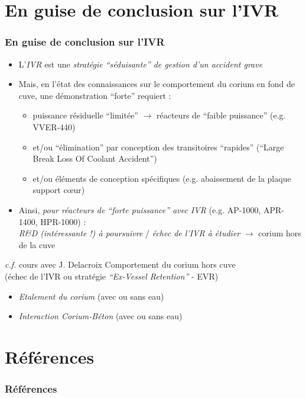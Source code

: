 \documentclass[usenames,dvipsnames,aspectratio=169, 10pt]{beamer}
\renewcommand{\emph}[1]{\textcolor{ceared}{\textit{#1}}}
\begin{document}
\section*{En guise de conclusion sur l'IVR}
\begin{frame}[fragile]
\frametitle{En guise de conclusion sur l'IVR}
\begin{itemize}
\item L'\emph{IVR} est une \emph{stratégie ``séduisante'' de gestion d'un accident grave}
\item Mais, en l'état des connaissances sur le comportement du corium en fond de cuve, une démonstration ``forte'' requiert :
\begin{itemize}
\item puissance résiduelle ``limitée'' $\rightarrow$ réacteurs de ``faible puissance'' (e.g. VVER-440) 
\item et/ou ``élimination'' par conception des transitoires ``rapides'' (``Large Break Loss Of Coolant Accident'')
\item et/ou éléments de conception spécifiques (e.g. abaissement de la plaque support c\oe ur)
\end{itemize}
\item Ainsi, \emph{pour réacteurs de ``forte puissance'' avec IVR} (e.g. AP-1000, APR-1400, HPR-1000) : \\ \emph{R\&D (intéressante !) à poursuivre} / 
\emph{échec de l'IVR à étudier} $\rightarrow$ corium hors de la cuve
\end{itemize}
\begin{exampleblock}{\textit{c.f.} cours avec J. Delacroix}
Comportement du corium hors cuve \\ (échec de l'IVR ou stratégie \emph{``Ex-Vessel Retention''} - EVR)
\begin{itemize}
  \item \emph{Etalement du corium} (avec ou sans eau)
  \item \emph{Interaction Corium-Béton} (avec ou sans eau)
\end{itemize}
\end{exampleblock}
\end{frame}


\section*{Références}
\begin{frame}
\frametitle{Références}
  
\end{frame}
\end{document}

